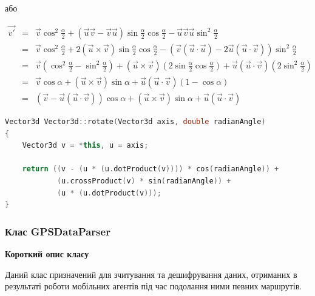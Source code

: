 \documentclass[simple,a4paper,14pt,ukrainian,utf8]{eskdtext}
\begin{document}
            або

            \begin{displaymath}
                \begin{array}{lll}
                    \vec{v'} &=& \vec{v} \cos^2 \frac{\alpha}{2} + (\vec{u}\vec{v} - \vec{v}\vec{u}) \sin \frac{\alpha}{2} \cos \frac{\alpha}{2} - \vec{u}\vec{v}\vec{u} \sin^2 \frac{\alpha}{2} \\
                    &=& \vec{v} \cos^2 \frac{\alpha}{2} + 2 (\vec{u} \times \vec{v}) \sin \frac{\alpha}{2} \cos \frac{\alpha}{2} - (\vec{v} (\vec{u} \cdot \vec{u}) - 2 \vec{u} (\vec{u} \cdot \vec{v})) \sin^2 \frac{\alpha}{2} \\
                    &=& \vec{v} (\cos^2 \frac{\alpha}{2} - \sin^2 \frac{\alpha}{2}) + (\vec{u} \times \vec{v}) (2 \sin \frac{\alpha}{2} \cos \frac{\alpha}{2}) + \vec{u} (\vec{u} \cdot \vec{v}) (2 \sin^2 \frac{\alpha}{2}) \\
                    &=& \vec{v} \cos \alpha + (\vec{u} \times \vec{v}) \sin \alpha + \vec{u} (\vec{u} \cdot \vec{v}) (1 - \cos \alpha) \\
                    &=& (\vec{v} - \vec{u} (\vec{u} \cdot \vec{v})) \cos \alpha + (\vec{u} \times \vec{v}) \sin \alpha + \vec{u} (\vec{u} \cdot \vec{v})
                \end{array}
            \end{displaymath}
            
\begin{small}
\begin{lstlisting}[language=C++]
Vector3d Vector3d::rotate(Vector3d axis, double radianAngle)
{
    Vector3d v = *this, u = axis;

    return ((v - (u * (u.dotProduct(v)))) * cos(radianAngle)) +
            (u.crossProduct(v) * sin(radianAngle)) +
            (u * (u.dotProduct(v)));
}
\end{lstlisting}
\end{small}

        \subsubsection{Клас GPSDataParser}
        
        \textbf{Короткий опис класу}
        
        Даний клас призначений для зчитування та дешифрування даних, отриманих в результаті роботи мобільних агентів під час подолання ними певних маршрутів.
        
\end{document}

